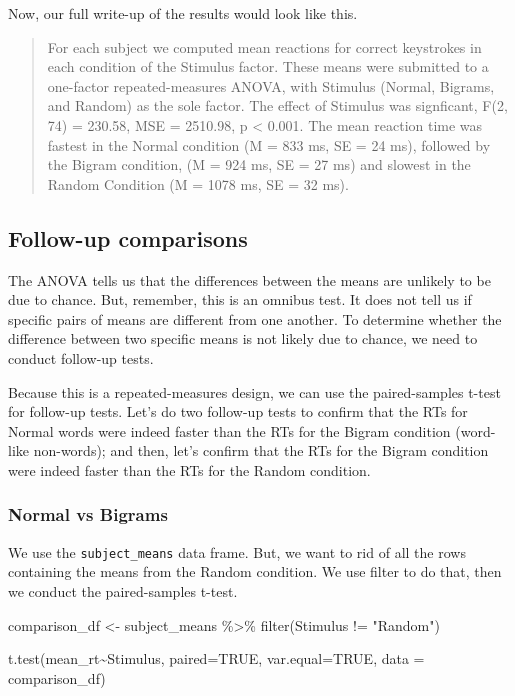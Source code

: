 \documentclass[
]{book}
\newenvironment{Shaded}{\begin{snugshade}}{\end{snugshade}}
\newcommand{\AttributeTok}[1]{\textcolor[rgb]{0.77,0.63,0.00}{#1}}
\newcommand{\ConstantTok}[1]{\textcolor[rgb]{0.00,0.00,0.00}{#1}}
\newcommand{\FunctionTok}[1]{\textcolor[rgb]{0.00,0.00,0.00}{#1}}
\newcommand{\NormalTok}[1]{#1}
\newcommand{\OtherTok}[1]{\textcolor[rgb]{0.56,0.35,0.01}{#1}}
\newcommand{\SpecialCharTok}[1]{\textcolor[rgb]{0.00,0.00,0.00}{#1}}
\newcommand{\StringTok}[1]{\textcolor[rgb]{0.31,0.60,0.02}{#1}}
\begin{document}
Now, our full write-up of the results would look like this.

\begin{quote}
For each subject we computed mean reactions for correct keystrokes in each condition of the Stimulus factor. These means were submitted to a one-factor repeated-measures ANOVA, with Stimulus (Normal, Bigrams, and Random) as the sole factor. The effect of Stimulus was signficant, F(2, 74) = 230.58, MSE = 2510.98, p \textless{} 0.001. The mean reaction time was fastest in the Normal condition (M = 833 ms, SE = 24 ms), followed by the Bigram condition, (M = 924 ms, SE = 27 ms) and slowest in the Random Condition (M = 1078 ms, SE = 32 ms).
\end{quote}

\hypertarget{follow-up-comparisons}{%
\subsection{Follow-up comparisons}\label{follow-up-comparisons}}

The ANOVA tells us that the differences between the means are unlikely to be due to chance. But, remember, this is an omnibus test. It does not tell us if specific pairs of means are different from one another. To determine whether the difference between two specific means is not likely due to chance, we need to conduct follow-up tests.

Because this is a repeated-measures design, we can use the paired-samples t-test for follow-up tests. Let's do two follow-up tests to confirm that the RTs for Normal words were indeed faster than the RTs for the Bigram condition (word-like non-words); and then, let's confirm that the RTs for the Bigram condition were indeed faster than the RTs for the Random condition.

\hypertarget{normal-vs-bigrams}{%
\subsubsection{Normal vs Bigrams}\label{normal-vs-bigrams}}

We use the \texttt{subject\_means} data frame. But, we want to rid of all the rows containing the means from the Random condition. We use filter to do that, then we conduct the paired-samples t-test.

\begin{Shaded}
\begin{Highlighting}[]
\NormalTok{comparison\_df }\OtherTok{\textless{}{-}}\NormalTok{ subject\_means }\SpecialCharTok{\%\textgreater{}\%}
                  \FunctionTok{filter}\NormalTok{(Stimulus }\SpecialCharTok{!=} \StringTok{"Random"}\NormalTok{)}

\FunctionTok{t.test}\NormalTok{(mean\_rt}\SpecialCharTok{\textasciitilde{}}\NormalTok{Stimulus, }
       \AttributeTok{paired=}\ConstantTok{TRUE}\NormalTok{, }
       \AttributeTok{var.equal=}\ConstantTok{TRUE}\NormalTok{, }
       \AttributeTok{data =}\NormalTok{ comparison\_df)}
\end{Highlighting}
\end{Shaded}
\end{document}
